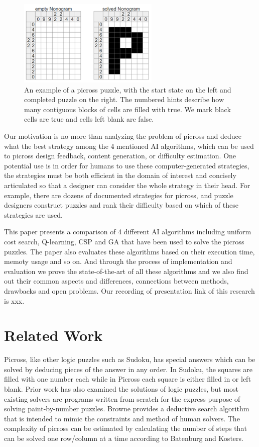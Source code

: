 \documentclass{svproc}
\begin{document}
\begin{figure}[h]
  \centering
  \includegraphics[width=0.6\textwidth]{picross1.png}
  \caption{An example of a picross puzzle, with the start state on the left and completed puzzle on the right. The numbered hints describe how many contiguous blocks of cells are filled with true. We mark black cells are true and cells left blank are false.}
\end{figure}

Our motivation is no more than analyzing the problem of picross and deduce what the best strategy among the 4 mentioned AI algorithms, which can be used to picross design feedback, content generation, or difficulty estimation. One potential use is in order for humans to use these computer-generated strategies, the strategies must be both efficient in the domain of interest and concisely articulated so that a designer can consider the whole strategy in their head. For example, there are dozens of documented strategies for picross\cite{picross1}, and puzzle designers construct puzzles and rank their difficulty based on which of these strategies are used\cite{picross2}.

This paper presents a comparison of 4 different AI algorithms including uniform cost search, Q-learning, CSP and GA that have been used to solve the picross puzzles. The paper also evaluates these algorithms based on their execution time, memoty usage and so on. And through the process of implementation and evaluation we prove the state-of-the-art of all these algorithms and we also find out their common aspects and differences, connections between methods, drawbacks and open problems. Our recording of presentation link of this research is xxx.


\section{Related Work}
Picross, like other logic puzzles such as Sudoku, has special answers which can be solved by deducing pieces of the answer in any order. In Sudoku, the squares are filled with one number each while in Picross each square is either filled in or left blank. Prior work has also examined the solutions of logic puzzles, but most existing solvers are programs written from scratch for the express purpose of solving paint-by-number puzzles\cite{5.1.1,5.1.2,5.1.3,5.1.7}. Browne provides a deductive search algorithm that is intended to mimic the constraints and method of human solvers\cite{Browne}. The complexity of picross can be estimated by calculating the number of steps that can be solved one row/column at a time according to Batenburg and Kosters\cite{Batenburg and Kosters}.
\end{document}

